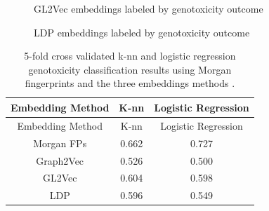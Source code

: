 \documentclass[
  super,
  preprint,
  3p]{elsarticle}
\begin{document}
\begin{figure}[H]


\caption{\label{fig-gl2vec}GL2Vec embeddings labeled by genotoxicity
outcome}

\end{figure}%

\begin{figure}[H]


\caption{\label{fig-ldp}LDP embeddings labeled by genotoxicity outcome}

\end{figure}%

\begin{longtable}[]{@{}ccc@{}}
\caption{5-fold cross validated k-nn and logistic regression
genotoxicity classification results using Morgan fingerprints and the
three embeddings methods .}\label{tbl-graph2vec}\tabularnewline
\toprule\noalign{}
Embedding Method & K-nn & Logistic Regression \\
\midrule\noalign{}
\endfirsthead
\toprule\noalign{}
Embedding Method & K-nn & Logistic Regression \\
\midrule\noalign{}
\endhead
\bottomrule\noalign{}
\endlastfoot
Morgan FPs & 0.662 & 0.727 \\
Graph2Vec & 0.526 & 0.500 \\
GL2Vec & 0.604 & 0.598 \\
LDP & 0.596 & 0.549 \\
\end{longtable}
\end{document}
